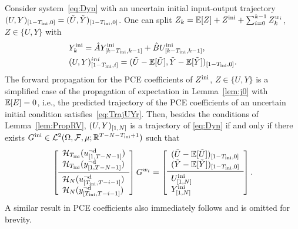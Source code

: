 \begin{rem} \label{rem:UncertainIni}
	Consider system~\eqref{eq:Dyn} with an uncertain initial input-output trajectory $(U,Y)_{[1-T_\text{ini},0]}=(\tilde{U},\tilde{Y})_{[1-T_\text{ini},0]}$. One can split $Z_k = \mathbb{E}[Z] +Z^{\text{ini}} + \sum_{i=0}^{k-1} Z_k^{w_i}$, $Z\in\{U,Y\}$ with
	\begin{align*}
		&Y^{\text{ini}}_k = \hat{A}Y^{\text{ini}}_{[k-T_\text{ini},k-1]} + \hat{B}U^{\text{ini}}_{[k-T_\text{ini},k-1]},\\
		&(U,Y)^{ini}_{[1-T_\text{ini},i]} = (\tilde{U}-\mathbb{E}[\tilde{U}],\tilde{Y}-\mathbb{E}[\tilde{Y}])_{[1-T_\text{ini},0]}.
	\end{align*}
	The forward propagation for the PCE coefficients of $Z^{\text{ini}}$, $Z\in\{U,Y\}$ is a simplified case of the propagation of expectation in Lemma~\ref{lem:j0} with $\mathbb{E}[E]=0$, i.e., the predicted trajectory of the PCE coefficients of an uncertain initial condition satisfies~\eqref{eq:TrajUYr}.
	Then, besides the conditions of Lemma~\ref{lem:PropRV}, $(U,Y)_{[1,N]}$ is a trajectory of \eqref{eq:Dyn} if and only if there exists $G^{\text{ini}}\in\mathcal{L}^2(\Omega, \mathcal{F}, \mu; \mathbb{R}^{T-N-T_\text{ini}+1})$ such that 
	\[
			\left[\begin{array}{ll} \Hankel_{\tini}(\traud{u}{1}{T-N-1})\\ \Hankel_{\tini}(\traud{y}{1}{T-N-1}) \\ \midrule \Hankel_{N}(\traud{u}{\tini}{T-i-1}) \\ \Hankel_{N}(\traud{y}{\tini}{T-i-1}) \end{array}\right] G^{w_i} 
		=\left[\begin{array}{ll} \tra{(\tilde{U}-\mean[\tilde{U}])}{1-\tini}{0}\\ \tra{(\tilde{Y}-\mean[\tilde{Y}])}{1-\tini}{0} \\ \midrule \tra{U^{\ini}}{1}{N} \\ \tra{Y^{\ini}}{1}{N} \end{array}\right].
	\]
	A similar result in PCE coefficients also immediately follows and is omitted for brevity.
\end{rem}

